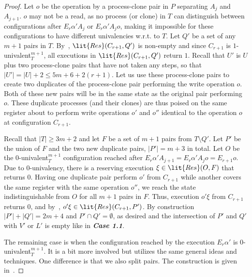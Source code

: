 \begin{proof}
Let $o$ be the operation by a process-clone pair in $P$ separating $A_j$ and $A_{j+1}$.
$o$ may not be a read, as no process (or clone) in $T$ can distinguish between configurations 
  after $E_r \alpha' A_j$ or $E_r \alpha' A_j o$,
  making it impossible for these configurations to have different univalencies w.r.t. to $T$.
Let $Q'$ be a set of any $m+1$ pairs in $T$. 
By~, $\lit{Res}(C_{r+1}, Q')$ is non-empty and since $C_{r+1}$ is $1$-univalent$_T^{m+1}$,
  all executions in $\lit{Res}(C_{r+1}, Q')$ return $1$.
Recall that $U'$ is $U$ plus two process-clone pairs that have not taken any steps,
  so that $|U'| = |U| + 2 \leq 5m + 6 + 2(r+1)$. 
Let us use these process-clone pairs to create two duplicates of the process-clone pair performing the write operation $o$.
Both of these new pairs will be in the same state as the original pair performing $o$.
These duplicate processes (and their clones) are thus poised on the same register about to perform 
  write operations $o'$ and $o''$ identical to the operation $o$ at configuration $C_{r+1}$. 

Recall that $|T| \geq 3m+2$ and let $F$ be a set of $m+1$ pairs from $T \setminus Q'$.
Let $P'$ be the union of $F$ and the two new duplicate pairs, $|P'| = m+3$ in total.
Let $O$ be the $0$-univalent$_T^{m+1}$ configuration reached after $E_r \alpha' A_{j+1} = E_r \alpha' A_j o = E_{r+1} o$.
Due to $0$-univalency, there is a reserving execution $\xi \in \lit{Res}(O, F)$ that returns $0$.
Having one duplicate pair perform $o'$ from $C_{r+1}$ while another covers the same register with the same operation $o''$, 
  we reach the state indistinguishable from $O$ for all $m+1$ pairs in $F$.
Thus, execution $o'\xi$ from $C_{r+1}$ returns $0$, and by~, $o'\xi \in \lit{Res}(C_{r+1}, P')$.
By construction $|P'| + |Q'| = 2m+4$ and $P' \cap Q' = \emptyset$, as desired and 
  the intersection of $P'$ and $Q'$ with $V'$ or $L'$ is empty like in \emph{\textbf{Case 1.1}}.

The remaining case is when the configuration reached by the execution $E_r \alpha'$ is $0$-univalent$_T^{m+1}$.
It is a bit more involved but utilizes the same general ideas and techniques.
One difference is that we also split pairs.
The construction is given in~.
\end{proof}
 